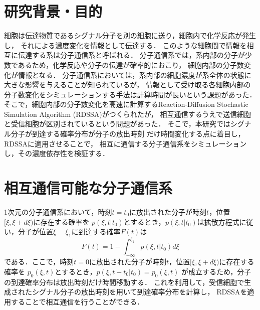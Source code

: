 \documentclass[twocolumn]{jarticle}
\begin{document}
\maketitle

\section{研究背景・目的}
細胞は伝達物質であるシグナル分子を別の細胞に送り，細胞内で化学反応が発生し，
それによる濃度変化を情報として伝達する．
このような細胞間で情報を相互に伝達する系は分子通信系と呼ばれる．
分子通信系では，系内部の分子が少数であるため，化学反応や分子の伝達が確率的におこり，
細胞内部の分子数変化が情報となる．
分子通信系においては，系内部の細胞濃度が系全体の状態に大きな影響を与えることが知られている\cite{Yamagishi}が，
情報として受け取る各細胞内部の分子数変化をシミュレーションする手法は計算時間が長いという課題があった．
そこで，細胞内部の分子数変化を高速に計算するReaction-Diffusion Stochastic Simulation Algorithm (RDSSA)\cite{hara}がつくられたが，
相互通信するうえで送信細胞と受信細胞が区別されているという問題があった．
そこで，本研究ではシグナル分子が到達する確率分布が分子の放出時刻
だけ時間変化する点に着目し，RDSSA\cite{hara}に適用させることで，
相互に通信する分子通信系をシミュレーションし，その濃度依存性を検証する．

\section{相互通信可能な分子通信系}
1次元の分子通信系において，時刻$t=t_0$に放出された分子が時刻$t$，位置$[\xi,\xi+d\xi)$に存在する確率を
$p(\xi,t|t_0)$とするとき，$p(\xi,t|t_0)$は拡散方程式に従い，分子が位置$\xi =\xi_1$に到達する確率$F(t)$は
\begin{equation}
    F(t) = 1- \int_{-\infty}^{\xi_1} p(\xi,t|t_0)d\xi
\end{equation}
である．ここで，時刻$t=0$に放出された分子が時刻$t$，位置$[\xi,\xi+d\xi)$に存在する確率を
$p_0(\xi,t)$とするとき，$p(\xi,t-t_0|t_0)=$$p_0(\xi,t)$
が成立するため，分子の到達確率分布は放出時刻だけ時間移動する．
これを利用して，受信細胞で生成されたシグナル分子の放出時刻を用いて到達確率分布を計算し，
RDSSA\cite{hara}を適用することで相互通信を行うことができる．
\end{document}
